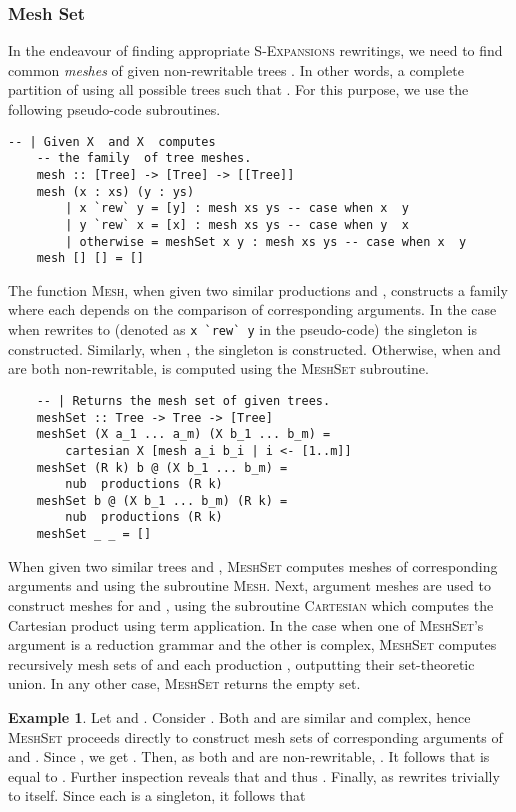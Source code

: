 \documentclass[11pt,a4paper]{amsart}
\theoremstyle{definition}
\newtheorem{example}[theorem]{Example}
\begin{document}
\subsubsection{Mesh Set}
In the endeavour of finding appropriate \textsc{S-Expansions} rewritings, we need to find common \emph{meshes} of given non-rewritable trees . In other words, a complete partition of  using all possible trees  such that . For this purpose, we use the following pseudo-code subroutines.

\begin{lstlisting}[mathescape=true]
    -- | Given X  and X  computes
    -- the family  of tree meshes. 
    mesh :: [Tree] -> [Tree] -> [[Tree]]
    mesh (x : xs) (y : ys)
        | x `rew` y = [y] : mesh xs ys -- case when x  y
        | y `rew` x = [x] : mesh xs ys -- case when y  x
        | otherwise = meshSet x y : mesh xs ys -- case when x  y
    mesh [] [] = []
\end{lstlisting}

The function \textsc{Mesh}, when given two similar productions  and , constructs a family  where each  depends on the comparison of corresponding arguments. In the case when  rewrites to  (denoted as \verb|x `rew` y| in the pseudo-code) the singleton  is constructed. Similarly, when , the singleton  is constructed. Otherwise, when  and  are both non-rewritable,  is computed using the \textsc{MeshSet} subroutine.

\begin{lstlisting}
    -- | Returns the mesh set of given trees.
    meshSet :: Tree -> Tree -> [Tree]
    meshSet (X a_1 ... a_m) (X b_1 ... b_m) =
    	cartesian X [mesh a_i b_i | i <- [1..m]]
    meshSet (R k) b @ (X b_1 ... b_m) = 
    	nub  productions (R k)
    meshSet b @ (X b_1 ... b_m) (R k) =
    	nub  productions (R k)
    meshSet _ _ = []		
\end{lstlisting}

When given two similar trees  and , \textsc{MeshSet} computes meshes  of corresponding arguments  and  using the subroutine \textsc{Mesh}. Next, argument meshes  are used to construct meshes for  and , using the subroutine \textsc{Cartesian} which computes the Cartesian product  using term application.
In the case when one of \textsc{MeshSet}'s argument is a reduction grammar  and the other  is complex, \textsc{MeshSet} computes recursively mesh sets of  and each production , outputting their set-theoretic union. In any other case, \textsc{MeshSet} returns the empty set.

\begin{example}
Let  and . Consider . Both  and  are similar and complex, hence
\textsc{MeshSet} proceeds directly to construct mesh sets of corresponding arguments
of  and . Since , we get . Then, as both  and  are non-rewritable, . It follows that 
is equal to . Further inspection reveals that
 and thus . Finally,  as  rewrites trivially to itself. Since each  is a singleton, it follows that

\end{example}
\end{document}
